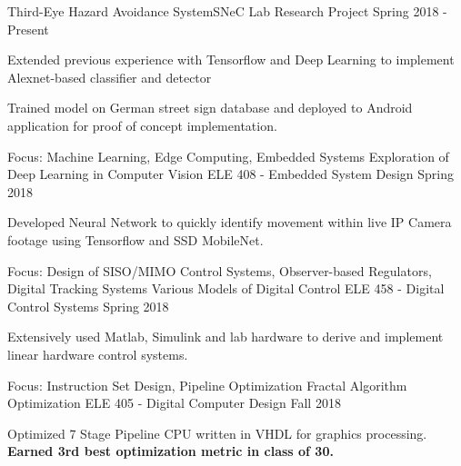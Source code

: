 \begin{cvprojectentries}
  {Third-Eye Hazard Avoidance System}{SNeC Lab Research Project}
  {Spring 2018 - Present}
  {
    \begin{cvitems}
        \item{Extended previous experience with Tensorflow and Deep Learning to implement Alexnet-based classifier and detector}
        \item{Trained model on German street sign database and deployed to Android application for proof of concept implementation.}
    \end{cvitems}
  }
  \cvprojectentry
    {Focus: Machine Learning, Edge Computing, Embedded Systems}
    {Exploration of Deep Learning in Computer Vision}
    {ELE 408 - Embedded System Design}
    {Spring 2018}
    {
      \begin{cvitems}
        \item{Developed Neural Network to quickly identify movement within live IP Camera footage using Tensorflow and SSD MobileNet.}
      \end{cvitems}
    }
  \cvprojectentry
    {Focus: Design of SISO/MIMO Control Systems, Observer-based Regulators, Digital Tracking Systems}
    {Various Models of Digital Control}
    {ELE 458 - Digital Control Systems}
    {Spring 2018}
    {
      \begin{cvitems}
        \item {Extensively used Matlab, Simulink and lab hardware to derive and implement linear hardware control systems.}
      \end{cvitems}
    }
  \cvprojectentry
    {Focus: Instruction Set Design, Pipeline Optimization}
    {Fractal Algorithm Optimization}
    {ELE 405 - Digital Computer Design}
    {Fall 2018}
    {
      \begin{cvitems}
        \item {Optimized 7 Stage Pipeline CPU written in VHDL for graphics processing. \textbf{Earned 3rd best optimization metric in class of 30.}}
      \end{cvitems}
    }
\end{cvprojectentries}
